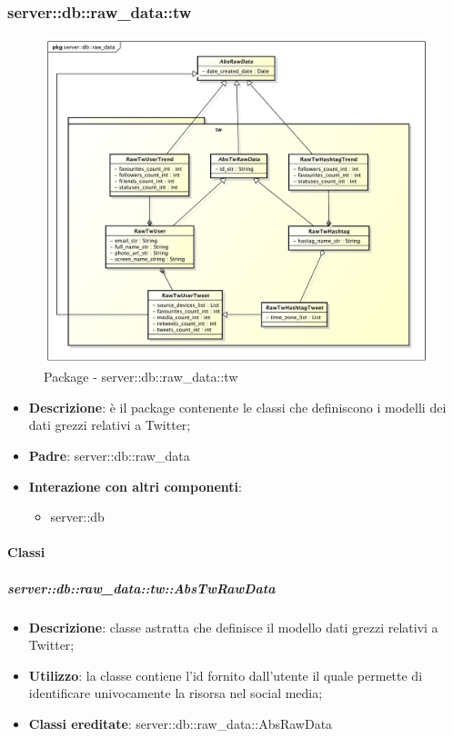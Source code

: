 		\subsubsection{server::db::raw\_data::tw} %
		\label{ssub:bdsm_app_server_db_raw_data_tw}
		\begin{figure}[htbp]
			\centering
			\centerline{\includegraphics[scale=0.45]{./images/server/raw_data_tw.pdf}}
			\caption{Package - server::db::raw\_data::tw}
		\end{figure}

		\begin{itemize}
		  \item \textbf{Descrizione}: è il package contenente le classi che definiscono i modelli dei dati grezzi relativi a Twitter;
		  \item \textbf{Padre}: server::db::raw\_data
		  \item \textbf{Interazione con altri componenti}:
		  	\begin{itemize}
		  		\item server::db
				\end{itemize}
		\end{itemize}

		\paragraph{Classi} %


		\subparagraph{server::db::raw\_data::tw::AbsTwRawData} %
		\label{subp:server_db_raw_data_tw_abstwrawdata}
			\begin{itemize}
				\item \textbf{Descrizione}: classe astratta che definisce il modello dati grezzi relativi a Twitter;
				\item \textbf{Utilizzo}: la classe contiene l'id fornito dall'utente il quale permette di identificare univocamente la risorsa nel social media;
				\item \textbf{Classi ereditate}: server::db::raw\_data::AbsRawData
			\end{itemize}



